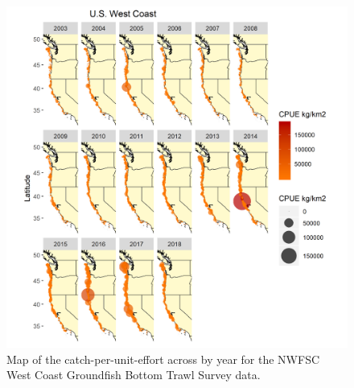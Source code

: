 \documentclass[12pt,]{article}
\begin{document}
\begin{figure}
\centering
\includegraphics{Figures/NWFSC_Combo_CPUE_Map_Year.png}
\caption{Map of the catch-per-unit-effort across by year for the NWFSC
West Coast Groundfish Bottom Trawl Survey data. \label{fig:nw_map}}
\end{figure}

\FloatBarrier
\end{document}
